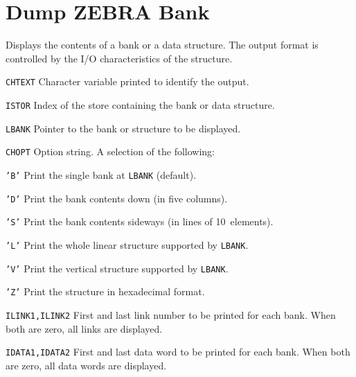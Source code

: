 \section{Dump ZEBRA Bank}
\label{DZSHOW}
Displays the contents of a bank or a data structure.
The output format is controlled by the I/O characteristics
of the structure.
\begin{mylist}
\item[\tt CHTEXT]
    Character variable printed to identify the output.
\item[\tt ISTOR]
    Index of the store containing the bank or data structure.
\item[\tt LBANK]
    Pointer to the bank or structure to be displayed.
\item[\tt CHOPT]
    Option string. A selection of the following:
    \begin{mylist}
    \item[\tt 'B']
        Print the single bank at {\tt LBANK} (default).
    \item[\tt 'D']
        Print the bank contents down (in five columns).
    \item[\tt 'S']
        Print the bank contents sideways (in lines of 10~elements).
    \item[\tt 'L']
        Print the whole linear structure supported by {\tt LBANK}.
    \item[\tt 'V']
        Print the vertical structure supported by {\tt LBANK}.
    \item[\tt 'Z']
        Print the structure in hexadecimal format.
    \end{mylist}
\item[\tt ILINK1,ILINK2]
    First and last link number to be printed for each bank.
    When both are zero, all links are displayed.
\item[\tt IDATA1,IDATA2]
    First and last data word to be printed for each bank.
    When both are zero, all data words are displayed.
\end{mylist}

